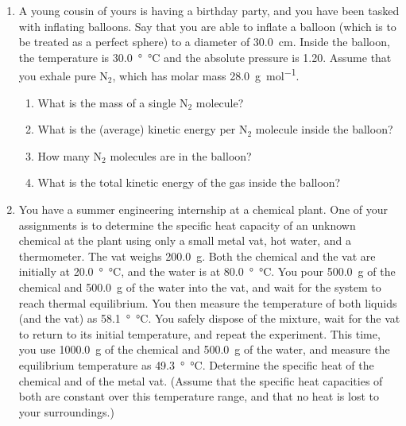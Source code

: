 \documentclass[11pt]{article}
\begin{document}
\begin{enumerate}

\newcommand{\diam}{\SI{30.0}{\cm}}
\newcommand{\temp}{\SI{30.0}{\degree\celsius}}
\newcommand{\press}{\SI{1.20}{\atm}}
\newcommand{\Nmass}{\SI{28.0}{\gram\per\mole}}

\newcommand{\Nw}{N$_2$}


\item A young cousin of yours is having a birthday party, and you have been tasked with inflating balloons.  Say that you are able to inflate a balloon (which is to be treated as a perfect sphere) to a diameter of {\diam}.  Inside the balloon, the temperature is {\temp} and the absolute pressure is {\press}.  Assume that you exhale pure {\Nw}, which has molar mass {\Nmass}.

\begin{enumerate}
	\item What is the mass of a single {\Nw} molecule?
	
	\item What is the (average) kinetic energy per {\Nw} molecule inside the balloon?
	
	\item How many {\Nw} molecules are in the balloon?
	
	\item What is the total kinetic energy of the gas inside the balloon?
\end{enumerate}


\bigskip


\newcommand{\rtemp}{\SI{20.0}{\degree\celsius}}
\newcommand{\vmass}{\SI{200.0}{\gram}}
\newcommand{\massq}{\SI{500.0}{\gram}}
\newcommand{\massw}{\SI{1000.0}{\gram}}
\newcommand{\wtemp}{\SI{80.0}{\degree\celsius}}
\newcommand{\tempq}{\SI{58.1}{\degree\celsius}}
\newcommand{\tempw}{\SI{49.3}{\degree\celsius}}


\item You have a summer engineering internship at a chemical plant.  One of your assignments is to determine the specific heat capacity of an unknown chemical at the plant using only a small metal vat, hot water, and a thermometer.  The vat weighs {\vmass}.  Both the chemical and the vat are initially at {\rtemp}, and the water is at {\wtemp}.  You pour {\massq} of the chemical and {\massq} of the water into the vat, and wait for the system to reach thermal equilibrium.  You then measure the temperature of both liquids (and the vat) as {\tempq}.  You safely dispose of the mixture, wait for the vat to return to its initial temperature, and repeat the experiment.  This time, you use {\massw} of the chemical and {\massq} of the water, and measure the equilibrium temperature as {\tempw}.  Determine the specific heat of the chemical and of the metal vat.  (Assume that the specific heat capacities of both are constant over this temperature range, and that no heat is lost to your surroundings.)

\end{enumerate}
\end{document}
